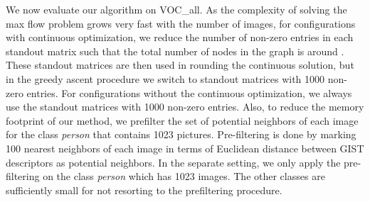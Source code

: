 \documentclass[10pt,twocolumn,letterpaper]{article}
\numberwithin{theorem}{section}
\begin{document}
\begin{table}
\centering
{}
\vspace{-2mm}
\caption{\small Performance on VOC\_all in separate setting with different configurations.
}
\label{table:performance_voc_all_separate}
\vspace{-6mm}
\end{table}

We now evaluate our algorithm on VOC\_all. As the complexity of solving the max flow problem grows very fast with the number of images, for configurations with continuous optimization, we reduce the number of non-zero entries in each standout matrix such that the total number of nodes in the graph is around . These standout matrices are then used in rounding the continuous solution, but in the greedy ascent procedure we switch to standout matrices with 1000 non-zero entries. For configurations without the continuous optimization, we always use the standout matrices with 1000 non-zero entries. Also, to reduce the memory footprint of our method, we prefilter the set of potential neighbors of each image for the class {\em person} that contains 1023 pictures. Pre-filtering is done by marking 100 nearest neighbors of each image in terms of Euclidean distance between GIST \cite{torralba2008small} descriptors as potential neighbors. In the separate setting, we only apply the pre-filtering on the class \textit{person} which has 1023 images. The other classes are sufficiently small for not resorting to the prefiltering procedure.
\end{document}
